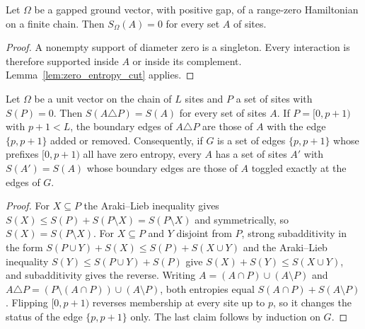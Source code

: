 \begin{lemma}
    \label{thm:chain_range_zero_entropy}
    \leanok
    Let $\Omega$ be a gapped ground vector, with positive gap, of a
    range-zero Hamiltonian on a finite chain. Then $S_\Omega(A)=0$
    for every set $A$ of sites.
\end{lemma}
\begin{proof}
    \leanok
    A nonempty support of diameter zero is a singleton. Every interaction
    is therefore supported inside $A$ or inside its complement.
    Lemma~\ref{lem:zero_entropy_cut} applies.
\end{proof}

\begin{lemma}
    \label{lem:zero_entropy_flip}
    \leanok
    Let $\Omega$ be a unit vector on the chain of $L$ sites and $P$ a set of
    sites with $S(P)=0$. Then $S(A\triangle P)=S(A)$ for every set of sites
    $A$. If $P=[0,p+1)$ with $p+1<L$, the boundary edges of $A\triangle P$ are
    those of $A$ with the edge $\{p,p+1\}$ added or removed. Consequently, if
    $G$ is a set of edges $\{p,p+1\}$ whose prefixes $[0,p+1)$ all have zero
    entropy, every $A$ has a set of sites $A'$ with $S(A')=S(A)$ whose boundary
    edges are those of $A$ toggled exactly at the edges of $G$.
\end{lemma}
\begin{proof}
    \leanok
    For $X\subseteq P$ the Araki--Lieb inequality gives
    $S(X)\le S(P)+S(P\setminus X)=S(P\setminus X)$ and symmetrically, so
    $S(X)=S(P\setminus X)$. For $X\subseteq P$ and $Y$ disjoint from $P$,
    strong subadditivity in the form
    $S(P\cup Y)+S(X)\le S(P)+S(X\cup Y)$ and the Araki--Lieb inequality
    $S(Y)\le S(P\cup Y)+S(P)$ give $S(X)+S(Y)\le S(X\cup Y)$, and
    subadditivity gives the reverse. Writing $A=(A\cap P)\cup(A\setminus P)$
    and $A\triangle P=(P\setminus(A\cap P))\cup(A\setminus P)$, both entropies
    equal $S(A\cap P)+S(A\setminus P)$. Flipping $[0,p+1)$ reverses membership
    at every site up to $p$, so it changes the status of the edge
    $\{p,p+1\}$ only. The last claim follows by induction on $G$.
\end{proof}

